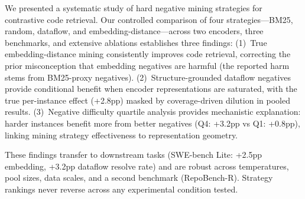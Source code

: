 \documentclass[11pt]{article}
\begin{document}
We presented a systematic study of hard negative mining strategies for contrastive code retrieval.
Our controlled comparison of four strategies---BM25, random, dataflow, and embedding-distance---across two encoders, three benchmarks, and extensive ablations establishes three findings:
(1)~True embedding-distance mining consistently improves code retrieval, correcting the prior misconception that embedding negatives are harmful (the reported harm stems from BM25-proxy negatives).
(2)~Structure-grounded dataflow negatives provide conditional benefit when encoder representations are saturated, with the true per-instance effect (+2.8pp) masked by coverage-driven dilution in pooled results.
(3)~Negative difficulty quartile analysis provides mechanistic explanation: harder instances benefit more from better negatives (Q4: +3.2pp vs Q1: +0.8pp), linking mining strategy effectiveness to representation geometry.

These findings transfer to downstream tasks (SWE-bench Lite: +2.5pp embedding, +3.2pp dataflow resolve rate) and are robust across temperatures, pool sizes, data scales, and a second benchmark (RepoBench-R).
Strategy rankings never reverse across any experimental condition tested.


\end{document}
